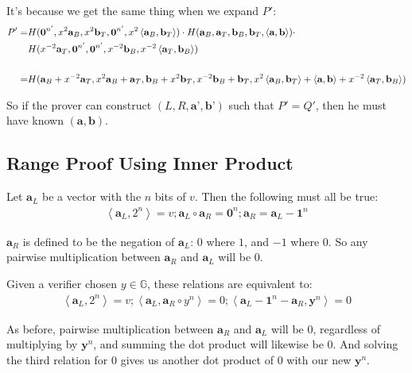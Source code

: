 \documentclass{article}
\begin{document}
It's because we get the same thing when we expand $P'$:
\begin{align}
  P' = &H(\textbf{0}^{n'}, x^2 \textbf{a}_{B}, x^2 \textbf{b}_{T}, \textbf{0}^{n'}, x^2 \left<\textbf{a}_{B}, \textbf{b}_{T}\right>) \cdot 
       H(\textbf{a}_{B}, \textbf{a}_{T}, \textbf{b}_{B}, \textbf{b}_{T}, \left<\textbf{a}, \textbf{b}\right>) \cdot \nonumber\\
       &H(x^{-2} \textbf{a}_{T}, \textbf{0}^{n'}, \textbf{0}^{n'}, x^{-2} \textbf{b}_{B}, x^{-2} \left<\textbf{a}_{T}, \textbf{b}_{B}\right>)\nonumber\\
  \cr = &H(\textbf{a}_{B} + x^{-2} \textbf{a}_{T}, x^2 \textbf{a}_{B} + \textbf{a}_{T},
          \textbf{b}_{B} + x^2 \textbf{b}_{T}, x^{-2} \textbf{b}_{B} + \textbf{b}_{T},
          x^2 \left<\textbf{a}_{B}, \textbf{b}_{T}\right> + \left<\textbf{a}, \textbf{b}\right> + x^{-2} \left<\textbf{a}_{T}, \textbf{b}_{B}\right>)
\end{align}

So if the prover can construct $(L, R, \textbf{a'}, \textbf{b'})$ such that $P' = Q'$, then he must have known $(\textbf{a}, \textbf{b})$.


\subsection{Range Proof Using Inner Product}

Let $\textbf{a}_L$ be a vector with the $n$ bits of $v$.  Then the following must all be true:
\begin{align}
  \left<\textbf{a}_L, 2^n\right> = v ; \textbf{a}_L \circ  \textbf{a}_R = \textbf{0}^n ; \textbf{a}_R = \textbf{a}_L - \textbf{1}^n
\end{align}
  
$\textbf{a}_R$ is defined to be the negation of $\textbf{a}_L$: $0$ where $1$, and $-1$ where $0$.  So any pairwise multiplication between $\textbf{a}_R$ and $\textbf{a}_L$ will be $0$.

Given a verifier chosen $y \in \mathbb{G}$, these relations are equivalent to:
\begin{align}
  \left<\textbf{a}_L, 2^n\right> = v ; \left<\textbf{a}_L, \textbf{a}_R \circ y^n\right> = 0 ; \left<\textbf{a}_L - \textbf{1}^n - \textbf{a}_R, \textbf{y}^n\right> = 0
\end{align}

As before, pairwise multiplication between $\textbf{a}_R$ and $\textbf{a}_L$ will be $0$, regardless of multiplying by $\textbf{y}^n$, and summing the dot product will likewise be $0$. And solving the third relation for $0$ gives us another dot product of $0$ with our new $\textbf{y}^n$.
\end{document}
